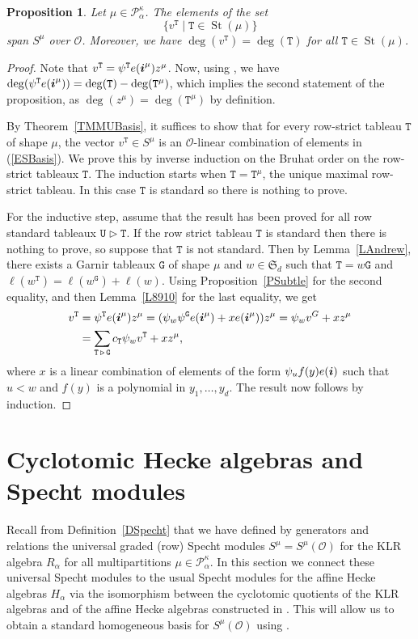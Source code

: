 \documentclass[twoside,11pt,reqno]{amsart}
\numberwithin{equation}{section}
\newtheorem{Proposition}[equation]{Proposition}
\theoremstyle{definition}  %
\DeclareMathOperator\gdom {\triangleright}
\def\bi{\text{\boldmath$i$}}
\newcommand{\St}{\operatorname{St}}
\newcommand{\0}{{\bar 0}}
\newcommand{\1}{{\bar 1}}
\newcommand{\al}{\alpha}
\def\Si{\mathfrak{S}}
\newcommand\Par[1][]{{\mathscr P}^{\kappa#1}}
\def\T{{\mathtt T}}
\def\U{{\mathtt U}}
\def\G{{\mathtt G}}
\renewcommand\O{\mathcal O}
\begin{document}
\begin{Proposition} \label{PSpan}%
Let $\mu\in\Par_\al$. The elements of the set
\begin{equation}\label{ESBasis}
\{v^\T\mid \T\in\St(\mu)\}
\end{equation}
span $S^\mu$ over $\O$. Moreover, we have $\deg(v^\T)=\deg(\T)$ for all $\T\in \St(\mu)$. 
\end{Proposition}
\begin{proof}
Note that $v^\T=\psi^\T e(\bi^\mu)z^\mu$. Now, using \cite[Corollary 3.14]{BKW}, we have  
$\deg(\psi^\T e(\bi^\mu))=\deg(\T)-\deg(\T^\mu)$, which implies the second statement of the proposition, as $\deg(z^\mu)=\deg(\T^\mu)$ by definition. 

By Theorem~\ref{TMMUBasis}, it suffices to show that for every row-strict tableau $\T$ of shape $\mu$, the vector $v^\T\in S^\mu$ is an $\O$-linear combination of elements in (\ref{ESBasis}). We prove this by inverse induction on the Bruhat order on the row-strict tableaux $\T$. The induction starts when $\T=\T^\mu$, the unique maximal row-strict tableau. In this case $\T$ is standard so there is nothing to prove. 

For the inductive step, assume that the result has been proved for all row standard tableaux $\U\gdom \T$. If the row strict tableau $\T$ is standard then there is  nothing to prove, so suppose that $\T$ is not standard. Then by Lemma~\ref{LAndrew}, there exists a Garnir tableaux $\G$ of shape $\mu$ and $w\in \Si_d$ such that $\T=w\G$ and $\ell(w^\T)=\ell(w^\G)+\ell(w)$. Using Proposition~\ref{PSubtle} for the second equality, and then Lemma~\ref{L8910} for the last equality, we get
\begin{align*}
v^\T&=\psi^\T e(\bi^\mu)z^\mu=(\psi_w\psi^\G e(\bi^\mu)+xe(\bi^\mu))z^\mu=\psi_wv^G+xz^\mu
\\
&=\sum_{\T\gdom\G} c_\T \psi_w v^\T+xz^\mu,
\end{align*}
where $x$ is a linear combination of elements of the form $\psi_uf(y)e(\bi)$ such that $u< w$ and $f(y)$ is a polynomial in $y_1,\dots,y_d$. The result now follows by induction.
\end{proof}






\section{Cyclotomic Hecke algebras and Specht modules}\label{SNot}
Recall from Definition~\ref{DSpecht} that we have defined  by generators and relations the universal graded (row) Specht modules $S^\mu=S^\mu(\O)$ for the KLR algebra $R_\al$ for all multipartitions $\mu\in\Par_\al$. In this section we connect these universal Specht modules to the usual Specht modules for the affine Hecke algebras $H_\al$ via the isomorphism between the cyclotomic quotients of the KLR algebras and of the affine Hecke algebras constructed in \cite{BK}. This will allow us to obtain a standard homogeneous basis for $S^\mu(\O)$ using \cite{BKW,HM}. 
\end{document}

